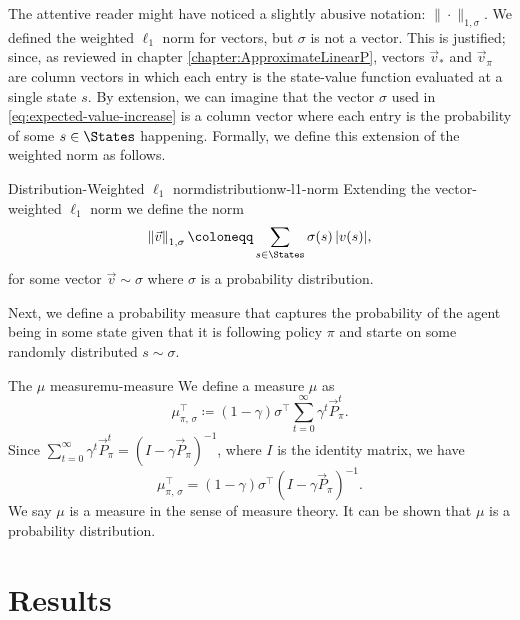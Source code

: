 The attentive reader might have noticed a slightly abusive notation: $\| \cdot
\|_{1, \sigma}$. We defined the weighted $\ell_1$ norm for vectors, but $\sigma$
is not a vector. This is justified; since, as reviewed in chapter
\ref{chapter:ApproximateLinearP}, vectors $\vec{v}_*$ and $\vec{v}_\pi$ are
column vectors in which each entry is the state-value function evaluated at a
single state $s$. By extension, we can imagine that the vector $\sigma$ used in
\eqref{eq:expected-value-increase} is a column vector where each entry is the
probability of some $s \in \States$ happening. Formally, we define this
extension of the weighted norm as follows.

\begin{dfn}{Distribution-Weighted $\ell_1$ norm}{distributionw-l1-norm}
    Extending the vector-weighted $\ell_1$ norm we define the norm
    \begin{equation*}
        \left\| \vec{v} \right\|_{1, \sigma} \coloneqq \sum_{s \in \States} \sigma(s) \, |v(s)|,
    \end{equation*}
    for some vector $\vec{v} \sim \sigma$ where $\sigma$ is a probability
    distribution.
\end{dfn}

Next, we define a probability measure that captures the probability of the agent
being in some state given that it is following policy $\pi$ and starte on some
randomly distributed $s \sim \sigma$.

\begin{dfn}{The $\mu$ measure}{mu-measure}
    We define a measure $\mu$ as
    \begin{equation*}
        \mu_{\pi, \, \sigma}^{\top} \coloneqq (1 - \gamma) \sigma^{\top} \sum_{t=0}^{\infty} \gamma^{t} \vec{P}_{\pi}^{t}.
    \end{equation*}
    Since $\sum_{t=0}^{\infty} \gamma^{t} \vec{P}_{\pi}^{t} = (I - \gamma
    \vec{P}_\pi)^{-1}$, where $I$ is the identity matrix, we have
    \begin{equation*}
        \mu_{\pi, \, \sigma}^{\top} = (1 - \gamma) \sigma^{\top} (I - \gamma \vec{P}_{\pi})^{-1}.
    \end{equation*}
    We say $\mu$ is a measure in the sense of measure theory. It can be shown
    \Cite[pg.~864]{farias2003LP2ADP} that $\mu$ is a probability distribution.
\end{dfn}

\section{Results}

